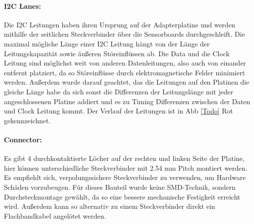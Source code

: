 \paragraph{I2C Lanes:}
Die I2C Leitungen haben ihren Ursprung auf der Adapterplatine und werden mithilfe der seitlichen Steckverbinder über die Sensorboards durchgeschleift.
Die maximal mögliche Länge einer I2C Leitung hängt von der Länge der Leitungskapazität sowie äußeren Störeinflüssen ab.
Die Data und die Clock Leitung sind möglichst weit von anderen Datenleitungen, also auch von einander entfernt platziert, da so Störeinflüsse durch elektromagnetische Felder minimiert werden.
Außerdem wurde darauf geachtet, das die Leitungen auf den Platinen die gleiche Länge habe da sich sonst die Differenzen der Leitungslänge mit jeder angeschlossenen Platine addiert und es zu Timing Differenzen zwischen der Daten und Clock Leitung kommt.
Der Verlauf der Leitungen ist in Abb \ref{Todo} Rot gekennzeichnet.

\paragraph{Connector:} Es gibt 4 durchkontaktierte Löcher auf der rechten und linken Seite der Platine, hier können unterschiedliche Steckverbinder mit 2.54 mm Pitch montiert werden.
	Es empfiehlt sich, verpolungssichere Steckverbinder zu verwenden, um Hardware Schäden vorzubeugen.
	Für dieses Bauteil wurde keine SMD-Technik, sondern Durchsteckmontage gewählt, da so eine bessere mechanische Festigkeit erreicht wird.
	Außerdem kann so alternativ zu einem Steckverbinder direkt ein Flachbandkabel angelötet werden.

